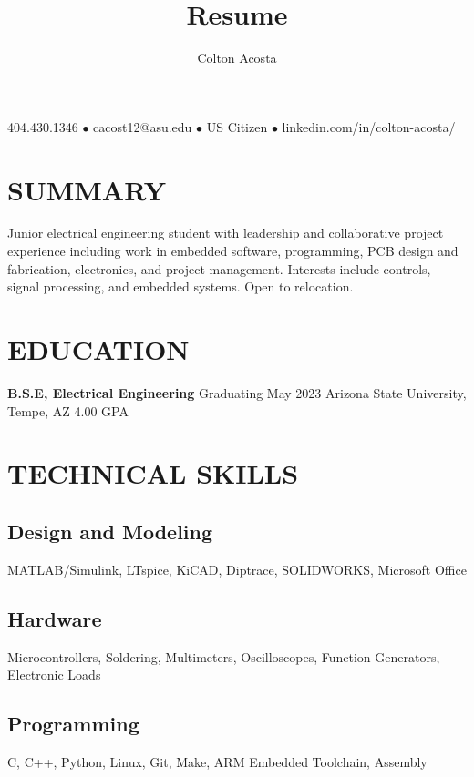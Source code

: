 \documentclass{article}
\makeatletter
\renewcommand{\maketitle}{
	\begin{center}
		{\huge\bfseries
			\theauthor}
			
		404.430.1346 $\bullet$ cacost12@asu.edu $\bullet$ US Citizen $\bullet$ linkedin.com/in/colton-acosta/
	\end{center}
}
\makeatother
\begin{document}
\title{Resume}
\author{Colton Acosta}
\maketitle
\section{SUMMARY}
Junior electrical engineering student with leadership and collaborative project  experience including work in embedded software, programming, PCB design and fabrication, electronics, and project management. Interests include controls, signal processing, and embedded systems. Open to relocation.
\section{EDUCATION}
\textbf{B.S.E, Electrical Engineering}
\hfill 
Graduating May 2023
\linebreak
Arizona State University, Tempe, AZ 
\hfill
4.00 GPA

\section{TECHNICAL SKILLS}
\subsection{Design and Modeling}
MATLAB/Simulink, LTspice, KiCAD, Diptrace, SOLIDWORKS, Microsoft Office
\subsection{Hardware}
Microcontrollers, Soldering, Multimeters, Oscilloscopes, Function Generators, Electronic Loads
\subsection{Programming} 
C, C++, Python, Linux, Git, Make, ARM Embedded Toolchain, Assembly
\end{document}
